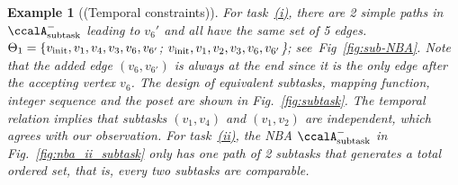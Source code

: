 \documentclass[Afour,sageh,times]{sagej}
\newtheorem{exmp}{Example}
\newcommand{\auto}[1]{\ccalA_{\textup{#1}}}
\newcommand{\vertex}[1]{v_{\textup{#1}}}
\newenvironment{cexmp}
{\addtocounter{exmp}{-1}\begin{exmp}}
  {\end{exmp}}
\begin{document}
\begin{cexmp}[(Temporal constraints)]
  For task~\hyperref[task:i]{\it (i)}, there are 2 simple paths in $\auto{subtask}^-$ leading to $v_6'$ and all have the same set of 5 edges.  $\Theta_1 = \{\vertex{init},v_1, v_4,v_3,v_6,v_{6'}$; $\vertex{init}, v_1, v_2,v_3, v_6, v_{6'}$\}; see~Fig~\ref{fig:sub-NBA}. Note that the added edge $(v_6, v_{6'})$ is always at the end since it is the only edge after the accepting vertex $v_6$. The design of equivalent subtasks, mapping function, integer sequence and the poset are shown in Fig.~\ref{fig:subtask}. The temporal relation implies that subtasks $(v_1, v_4)$ and $(v_1, v_2)$ are independent, which agrees with our observation. For task~\hyperref[task:ii]{\it (ii)}, the NBA $\auto{subtask}^-$ in Fig.~\ref{fig:nba_ii_subtask} only has one path of 2 subtasks that generates a total ordered set, that is, every two subtasks are comparable.
\end{cexmp}


\end{document}
